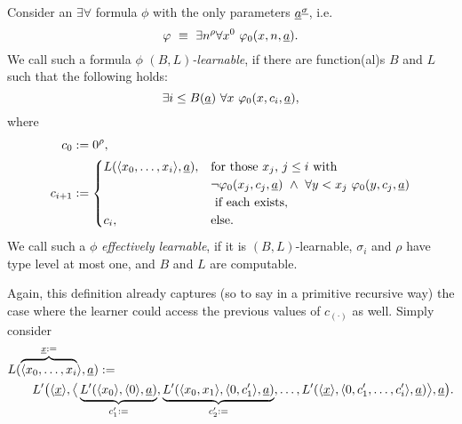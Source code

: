 \begin{dfn}\label{d:fmcNum}
Consider an $\exists\forall$ formula $\phi$ with the only parameters $\underline a^{\underline \sigma}$, i.e.
\[\varphi\ \equiv\ \exists n^\rho \forall x^0\ \varphi_0(x,n,\underline a).\]
We call such a formula $\phi$ 
{\em $(B,L)$-learnable},
if there are function(al)s $B$ and $L$ such that the following holds:
\[ \exists i\leq B(\underline a)\ \forall x\ \varphi_0(x,c_i,\underline a),\] where
\begin{align*}
c_0&:=0^{\rho},\\
c_{i+1}&:=
\begin{cases}
L(\langle x_0,\ldots,x_i\rangle, \tup a), &\text{for those $x_j$, $j\leq i$ with }\\
 &\neg\phi_0(x_j,c_j,\tup a)\ \wedge\ \forall y<x_j\ \phi_0(y,c_j,\tup a)\\
  &\text{ if each exists},\\
c_i, &\Telse.
\end{cases}
\end{align*}
We call such a $\phi$ {\em effectively learnable}, if it is $(B,L)$-learnable,
$\sigma_i$ and $\rho$ have type level at most one, and $B$ and $L$ are computable.
\end{dfn}
\newcommand{\seq}{_{(\cdot)}}
\begin{rmk}\label{r:allx}
Again, this definition already captures (so to say in a primitive recursive way) the case where the learner could access the previous values of $c\seq$ as well. Simply consider
\begin{align*}
&L(\overbrace{\langle x_0,\ldots,x_i}^{\underline x:=}\rangle, \underline a):=\\&\quad \quad
L'\big(\langle \underline x\rangle, \big\langle
 \underbrace{L'(\langle x_0\rangle, \langle 0\rangle,\underline a)}_{c'_1:=},
 \underbrace{L'(\langle x_0,x_1\rangle, \langle 0,c'_1\rangle,\underline a)}_{c'_2:=}, 
 \ldots,
 L'(\langle \underline x\rangle, \langle 0,c'_1,\ldots,c'_i\rangle,\underline a)
 \big\rangle, \underline a\big). 
\end{align*}
\end{rmk}

